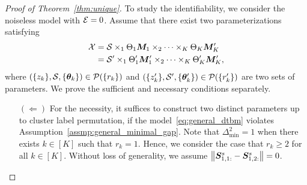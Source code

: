 \documentclass[journal]{IEEEtran}
\theoremstyle{definition}
\theoremstyle{definition}
\newcommand{\of}[1]{\left(#1\right)}
\begin{document}
\begin{proof}[Proof of Theorem~\ref{thm:unique}] 

To study the identifiability, we consider the noiseless model with $\mathcal{E} = 0$. Assume that there exist two parameterizations satisfying
\begin{align}
    \tX&=\tS\times_1\Theta_1 \mM_1 \times_2 \cdots \times_K \Theta_K \mM'_K\\
    &=\tS'\times_1\Theta'_1 \mM'_1 \times_2 \cdots \times_K \Theta'_K \mM'_K,\label{eq:another}
\end{align}
where $\of{ \{z_k\}, \tS, \{ \mtheta_k \} } \in \tP(\{r_k\})$ and $\of{ \{z'_k\}, \tS', \{ \mtheta'_k \} } \in \tP(\{r_k'\})$ are two sets of parameters. We prove the sufficient and necessary conditions separately.

\begin{enumerate}[wide]
    \item[$(\Leftarrow)$] For the necessity, it suffices to construct two distinct parameters up to cluster label permutation, if the model~\eqref{eq:general_dtbm} violates Assumption~\ref{assmp:general_minimal_gap}. {Note that $\Delta_{\min}^2 = 1$ when there exists $k \in [K]$ such that $r_k = 1$. Hence, we consider the case that  $r_k \geq 2$ for all $k \in [K]$.}  Without loss of generality, we assume $\left\lVert \bm S_{1,1:}^s - \bm S_{1,2:}^s \right\rVert = 0$.

{
  
}
\end{enumerate}
\end{proof}
\end{document}
